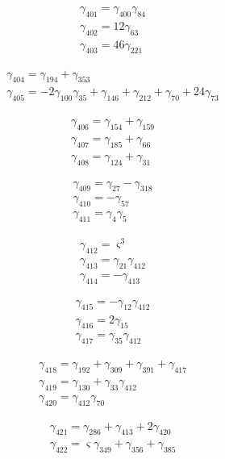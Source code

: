 \[\begin{aligned}\gamma_{401}=\gamma_{400} \gamma_{84}\\ \gamma_{402}=12 \gamma_{63}\\ \gamma_{403}=46 \gamma_{221}\end{aligned}\]

\[\begin{aligned}\gamma_{404}=\gamma_{194} + \gamma_{353}\\ \gamma_{405}=- 2 \gamma_{100} \gamma_{35} + \gamma_{146} + \gamma_{212} + \gamma_{70} + 24 \gamma_{73}\end{aligned}\]

\[\begin{aligned}\gamma_{406}=\gamma_{154} + \gamma_{159}\\ \gamma_{407}=\gamma_{185} + \gamma_{66}\\ \gamma_{408}=\gamma_{124} + \gamma_{31}\end{aligned}\]

\[\begin{aligned}\gamma_{409}=\gamma_{27} - \gamma_{318}\\ \gamma_{410}=- \gamma_{57}\\ \gamma_{411}=\gamma_{4} \gamma_{5}\end{aligned}\]

\[\begin{aligned}\gamma_{412}=\varsigma ^{3}\\ \gamma_{413}=\gamma_{21} \gamma_{412}\\ \gamma_{414}=- \gamma_{413}\end{aligned}\]

\[\begin{aligned}\gamma_{415}=- \gamma_{12} \gamma_{412}\\ \gamma_{416}=2 \gamma_{15}\\ \gamma_{417}=\gamma_{35} \gamma_{412}\end{aligned}\]

\[\begin{aligned}\gamma_{418}=\gamma_{192} + \gamma_{309} + \gamma_{391} + \gamma_{417}\\ \gamma_{419}=\gamma_{130} + \gamma_{33} \gamma_{412}\\ \gamma_{420}=\gamma_{412} \gamma_{70}\end{aligned}\]

\[\begin{aligned}\gamma_{421}=\gamma_{286} + \gamma_{413} + 2 \gamma_{420}\\ \gamma_{422}=\varsigma  \gamma_{349} + \gamma_{356} + \gamma_{385}\end{aligned}\]

